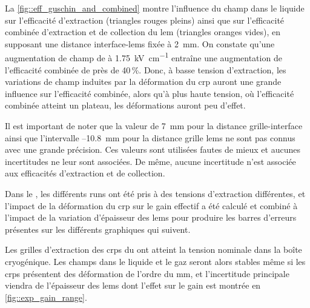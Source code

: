       La \autoref{fig::eff_guschin_and_combined} montre l'influence du champ dans le liquide sur l'efficacité d'extraction (triangles rouges pleins) ainsi que sur l'efficacité combinée d'extraction et de collection du \gls{lem} (triangles oranges vides), en supposant une distance interface-\glspl{lem} fixée à \SI{2}{\milli\meter}. On constate qu'une augmentation de champ de  à \SI{1.75}{\kilo\volt\per\centi\meter} entraîne une augmentation de l'efficacité combinée de près de 40\,\%. Donc, à basse tension d'extraction, les variations de champ induites par la déformation du \gls{crp} auront une grande influence sur l'efficacité combinée, alors qu'à plus haute tension, où l'efficacité combinée atteint un plateau, les déformations auront peu d'effet.

      Il est important de noter que la valeur de \SI{7}{\milli\meter} pour la distance grille-interface ainsi que l'intervalle --\SI{10.8}{\milli\meter} pour la distance grille \glspl{lem} ne sont pas connus avec une grande précision. Ces valeurs sont utilisées fautes de mieux et aucunes incertitudes ne leur sont associées. De même, aucune incertitude n'est associée aux efficacités d'extraction et de collection.

      Dans le \TOO{}, les différents runs ont été pris à des tensions d'extraction différentes, et l'impact de la déformation du \gls{crp} sur le gain effectif a été calculé et combiné à l'impact de la variation d'épaisseur des \glspl{lem} pour produire les barres d'erreurs présentes sur les différents graphiques qui suivent.

      Les grilles d'extraction des \glspl{crp} du \SSS{} ont atteint la tension nominale dans la boîte cryogénique. Les champs dans le liquide et le gaz seront alors stables même si les \glspl{crp} présentent des déformation de l'ordre du \si{\milli\meter}, et l'incertitude principale viendra de l'épaisseur des \glspl{lem} dont l'effet sur le gain est montrée en \autoref{fig::exp_gain_range}.
    
        
